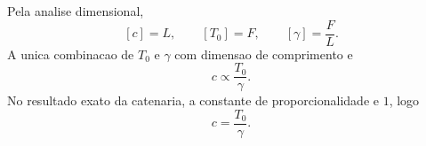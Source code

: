 Pela analise dimensional,
\[
[c]=L, \qquad [T_0]=F, \qquad [\gamma]=\frac{F}{L}.
\]
A unica combinacao de $T_0$ e $\gamma$ com dimensao de comprimento e
\[
c \propto \frac{T_0}{\gamma}.
\]
No resultado exato da catenaria, a constante de proporcionalidade e $1$, logo
\[
c = \frac{T_0}{\gamma}.
\]

